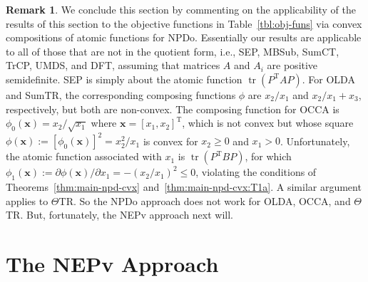 \documentclass[11pt]{article}
\def\bx{\pmb{x}}
\DeclareMathOperator{\tr}{tr}
\DeclareMathOperator{\T}{T}
\theoremstyle{definition}
\newtheorem{remark}{Remark}[section]
\numberwithin{equation}{section}
\begin{document}
\begin{remark}\label{rk:app-NPDo-cvx}
We conclude this section by commenting on the applicability of the results of this section to the objective functions
in Table~\ref{tbl:obj-funs} via convex compositions of atomic functions for NPDo. Essentially our results are applicable to
all of those that are not in the quotient form, i.e., SEP, MBSub, SumCT, TrCP, UMDS, and DFT, assuming that matrices $A$ and $A_i$
are positive semidefinite. SEP is simply about the atomic function $\tr(P^{\T}AP)$.
For OLDA and SumTR, the corresponding composing functions $\phi$ are
$x_2/x_1$ and $x_2/x_1+x_3$, respectively, but both are non-convex.
The composing function for OCCA is $\phi_0(\bx)=x_2/\sqrt{x_1}$ where $\bx=[x_1,x_2]^{\T}$, which is not convex but whose square
$\phi(\bx):=[\phi_0(\bx)]^2=x_2^2/x_1$ is convex for $x_2\ge 0$ and $x_1>0$. Unfortunately,
the atomic function associated with $x_1$ is $\tr(P^{\T}BP)$, for which
$\phi_1(\bx):=\partial\phi(\bx)/\partial x_1=-(x_2/x_1)^2\le 0$, violating the conditions of Theorems~\ref{thm:main-npd-cvx}
and~\ref{thm:main-npd-cvx:T1a}. A similar argument applies to $\Theta$TR.
So the NPDo approach does not work for OLDA, OCCA, and $\Theta$TR. But, fortunately, the NEPv approach next will.
\end{remark}


\clearpage
\part{The NEPv Approach}

\end{document}
